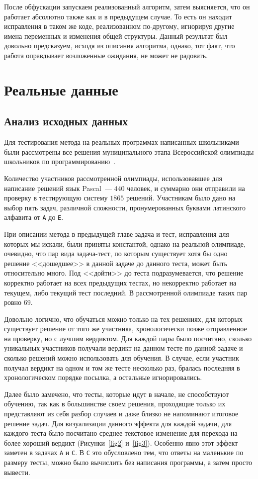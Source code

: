 После обфускации запускаем реализованный алгоритм, затем выясняется, что он работает абсолютно также как и  в предыдущем случае.
То есть он находит исправления в таком же коде, реализованном по-другому, игнорируя другие имена переменных и изменения общей структуры.
Данный результат был довольно предсказуем, исходя из описания алгоритма, однако, тот факт, что работа оправдывает 
возложенные ожидания, не может не радовать.
\section{Реальные данные}

\subsection{Анализ исходных данных}

Для тестирования метода на реальных программах написанных школьниками были рассмотрены все решения муниципального
этапа Всероссийской олимпиады школьников по программированию~\cite{municipal}.

Количество участников рассмотренной олимпиады, использовавшее для написание решений язык Pascal~--- $440$ человек, и суммарно
они отправили на проверку в тестирующую систему $1865$ решений. Участникам было дано на выбор пять задач, различной сложности,
пронумерованных буквами латинского алфавита от \texttt{A} до \texttt{E}.

При описании метода в предыдущей главе задача и тест, исправления для которых мы искали, были приняты константой, однако
на реальной олимпиаде, очевидно, что пар вида задача-тест, по которым существует хотя бы одно решение <<дошедшее>> в данной задаче
до данного теста, может быть относительно много. Под <<дойти>> до теста подразумевается, что решение корректно работает на всех 
предыдущих тестах, но некорректно работает на текущем, либо текущий тест последний. В рассмотренной олимпиаде таких пар ровно
$69$.

Довольно логично, что обучаться можно только на тех решениях, для которых существует решение от того же участника, хронологически
позже отправленное на проверку, но с лучшим вердиктом.
Для каждой пары было посчитано, сколько уникальных участников получали вердикт на данном тесте по данной задаче и сколько решений 
можно использовать для обучения. В случае, если участник получал вердикт на одном и том же тесте несколько раз, бралась
последняя в хронологическом порядке посылка, а остальные игнорировались.

Далее было замечено, что тесты, которые идут в начале, не способствуют обучению, так как в большинстве своем решения, проходящие
только их представляют из себя разбор случаев и даже близко не напоминают итоговое решение задач. Для визуализации данного эффекта
для каждой задачи, для каждого теста было посчитано среднее текстовое изменение для перехода на более хороший вердикт 
(Рисунки~\ref{fig2} и~\ref{fig3}). Особенно явно этот эффект заметен в задачах \texttt{A} и \texttt{C}. В \texttt{C} это обусловлено
тем, что ответы на маленькие по размеру тесты, можно было вычислить без написания программы, а затем просто вывести.  
 
